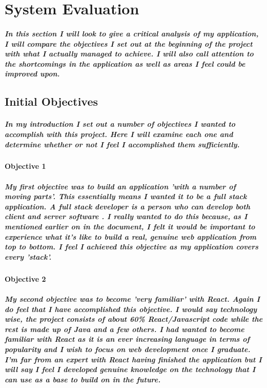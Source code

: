 \chapter{System Evaluation}
\paragraph{In this section I will look to give a critical analysis of my application, I will compare the objectives I set out at the beginning of the project with what I actually managed to achieve. I will also call attention to the shortcomings in the application as well as areas I feel could be improved upon.}


\section{Initial Objectives}
\paragraph{In my introduction I set out a number of objectives I wanted to accomplish with this project. Here I will examine each one and determine whether or not I feel I accomplished them sufficiently.}

\subsubsection{Objective 1}
\paragraph{My first objective was to build an application 'with a number of moving parts'. This essentially means I wanted it to be a full stack application. A full stack developer is a person who can develop both client and server software \cite{FullStack}. I really wanted to do this because, as I mentioned earlier on in the document, I felt it would be important to experience what it's like to build a real, genuine web application from top to bottom. I feel I achieved this objective as my application covers every 'stack'.}

\subsubsection{Objective 2}
\paragraph{My second objective was to become 'very familiar' with React. Again I do feel that I have accomplished this objective. I would say technology wise, the project consists of about 60\% React/Javascript code while the rest is made up of Java and a few others. I had wanted to become familiar with React as it is an ever increasing language in terms of popularity and I wish to focus on web development once I graduate. I'm far from an expert with React having finished the application but I will say I feel I developed genuine knowledge on the technology that I can use as a base to build on in the future.}

